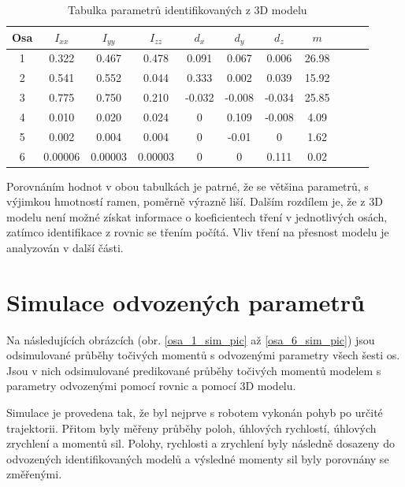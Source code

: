 \begin{table}[htbp]
  \centering
  \caption{Tabulka parametrů identifikovaných z 3D modelu}
    \begin{tabular}{c|cccccccccc}
    \multicolumn{1}{c|}{Osa} & \multicolumn{1}{c}{$I_{xx}$} & \multicolumn{1}{c}{$I_{yy}$} & \multicolumn{1}{c}{$I_{zz}$} & \multicolumn{1}{c}{$d_x$} & \multicolumn{1}{c}{$d_y$} & \multicolumn{1}{c}{$d_z$} & \multicolumn{1}{c}{$m$} \\
    \hline
    1  & 0.322   & 0.467   & 0.478   & 0.091 & 0.067 & 0.006 & 26.98 \\
    2  & 0.541   & 0.552   & 0.044   & 0.333 & 0.002 & 0.039 & 15.92 \\
    3  & 0.775   & 0.750   & 0.210   &-0.032 &-0.008 &-0.034 & 25.85 \\
    4  & 0.010   & 0.020   & 0.024   & 0     & 0.109 &-0.008 & 4.09  \\
    5  & 0.002   & 0.004   & 0.004   & 0     &-0.01  & 0     & 1.62  \\
    6  & 0.00006 & 0.00003 & 0.00003 & 0     & 0     & 0.111 & 0.02  \\
    \end{tabular}%
  \label{tab_ind_hodnot_3d}%
\end{table}%

Porovnáním hodnot v obou tabulkách je patrné, že se většina parametrů, s výjimkou hmotností ramen, poměrně výrazně liší. Dalším rozdílem je, že z 3D modelu není možné získat informace o koeficientech tření v jednotlivých osách, zatímco identifikace z rovnic se třením počítá. Vliv tření na přesnost modelu je analyzován v další části.

\section{Simulace odvozených parametrů}

Na následujících obrázcích (obr. \ref{osa_1_sim_pic} až \ref{osa_6_sim_pic}) jsou odsimulované průběhy točivých momentů s odvozenými parametry všech šesti os. Jsou v nich odsimulované predikované průběhy točivých momentů modelem s parametry odvozenými pomocí rovnic a pomocí 3D modelu. 

Simulace je provedena tak, že byl nejprve s robotem vykonán pohyb po určité trajektorii. Přitom byly měřeny průběhy poloh, úhlových rychlostí, úhlových zrychlení a momentů sil. Polohy, rychlosti a zrychlení byly následně dosazeny do odvozených identifikovaných modelů a výsledné momenty sil byly porovnány se změřenými.

